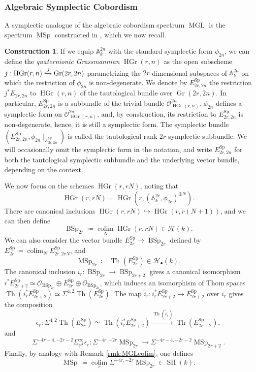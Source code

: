 \documentclass[10pt]{amsart}
\theoremstyle{definition}
\newtheorem{constr}[defn]{Construction}
\theoremstyle{plain}
\numberwithin{equation}{section}
\newcommand{\0}{\emptyset}
\newcommand{\sH}{{\mathcal H}}
\newcommand{\A}{{\mathbb A}}
\renewcommand{\P}{{\mathbb P}}
\newcommand{\MGL}{{\operatorname{MGL}}}
\newcommand{\MSp}{{\operatorname{MSp}}}
\newcommand{\BSp}{{\operatorname{BSp}}}
\newcommand{\Sp}{{\operatorname{Sp}}}
\newcommand{\Gr}{{\operatorname{Gr}}}
\newcommand{\HGr}{{\operatorname{HGr}}}
\newcommand{\SH}{{\operatorname{SH}}}
\newcommand{\Th}{{\operatorname{Th}}}
\newcommand{\colim}{{\operatorname*{colim}}}
\begin{document}
 \subsubsection{Algebraic Symplectic Cobordism}
 \label{subsection:MSp}

A symplectic analogue of the algebraic cobordism spectrum $\MGL$ is the spectrum $\MSp$ constructed in \cite[Section 6]{Panwal-cobordism}, which we now recall.

\begin{constr}
\label{constr:MSp}
    If we equip $\A_k^{2n}$ with the standard symplectic form $\phi_{2n}$, we can define the \emph{quaternionic Grassmannian} $\HGr(r,n)$ as the open subscheme $j:\HGr(r,n) \xhookrightarrow{j} \Gr(2r,2n)$ parametrizing the $2r$-dimensional subspaces of $\A_k^{2n}$ on which the restriction of $\phi_{2n}$ is non-degenerate. We denote by $E_{2r,2n}^\Sp$ the restriction $j^*E_{2r,2n}$ to $\HGr(r,n)$ of the tautological bundle over $\Gr(2r,2n)$. In particular, $E_{2r,2n}^\Sp$ is a subbundle of the trivial bundle $\mathcal{O}_{\HGr(r,n)}^{2n}$. $\phi_{2n}$ defines a symplectic form on $\mathcal{O}_{\HGr(r,n)}^{2n}$, and, by construction, its restriction to $E_{2r,2n}^\Sp$ is non-degenerate, hence, it is still a symplectic form. The symplectic bundle $(E_{2r,2n}^\Sp,\phi_{2n} \mid_{E_{2r,2n}^\Sp})$ is called the tautological rank $2r$ symplectic subbundle. We will occasionally omit the symplectic form in the notation, and write $E_{2r,2n}^\Sp$ for both the tautological symplectic subbundle and the underlying vector bundle, depending on the context.

    We now focus on the schemes $\HGr(r,rN)$, noting that
    $$\HGr(r,rN)=\HGr(r,(\A^{2r}_k,\phi_{2r})^{\oplus N}).$$
    There are canonical inclusions $\HGr(r,rN) \hookrightarrow \HGr(r,r(N +1))$, and we can then define 
    $$\BSp_{2r} \coloneqq \colim_N \HGr(r,rN) \in \sH(k).$$
    We can also consider the vector bundle $E_{2r}^\Sp \to \BSp_{2r}$ defined by $E_{2r}^\Sp \coloneqq \colim_N E_{2r,2rN}^\Sp$, and
    $$\MSp_{2r} \coloneqq \Th(E_{2r}^\Sp) \in \sH_{\bullet}(k).$$
    The canonical inclusion $i_r:\BSp_{2r} \to \BSp_{2r+2}$ gives a canonical isomorphism $i^*E_{2r+2}^\Sp \simeq \mathcal{O}_{\BSp_{2r}} \oplus E_{2r}^\Sp \oplus \mathcal{O}_{\BSp_{2r}}$, which induces an isomorphism of Thom spaces $\Th(i_r^*E_{2r+2}^\Sp)\simeq \Sigma^{4,2}\Th(E_{2r}^\Sp)$. The map $\tilde{i}_r:i_r^*E_{2r+2}^\Sp \to E_{2r+2}^\Sp$ over $i_r$ gives the composition 
    $$\epsilon_r:\Sigma^{4,2}\Th(E_{2r}^\Sp) \simeq \Th(i^*_r E_{2r+2}^\Sp) \xrightarrow{\Th(\tilde{i}_r)}\Th(E_{2r+2}^\Sp),$$
    and
    $$\Sigma^{-4r-4,-2r-2}\Sigma_{\P^1}^\infty \epsilon_r:\Sigma^{-4r,-2r}\MSp_{2r} \to \Sigma^{-4r-4,-2r-2}\MSp_{2r+2}.$$
    Finally, by analogy with Remark \ref{rmk:MGLcolim}, one defines
    $$\MSp \coloneqq \colim_r \Sigma^{-4r,-2r}\MSp_{2r} \in \SH(k).$$
\end{constr}
\end{document}
